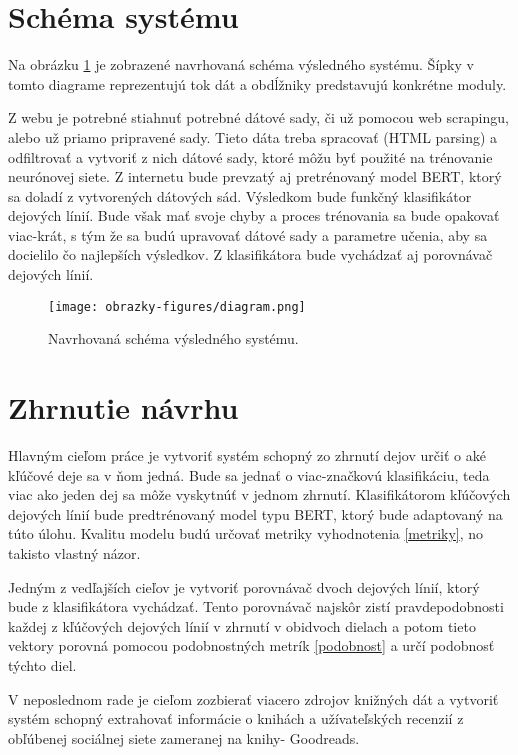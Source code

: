 \section{Schéma systému}

Na obrázku \ref{schema} je zobrazené navrhovaná schéma výsledného systému. Šípky v tomto diagrame reprezentujú tok dát a obdĺžniky predstavujú konkrétne moduly.

Z webu je potrebné stiahnuť potrebné dátové sady, či už pomocou web scrapingu, alebo už priamo pripravené sady. Tieto dáta treba spracovať (HTML parsing) a odfiltrovať a vytvoriť z nich dátové sady, ktoré môžu byť použité na trénovanie neurónovej siete. Z internetu bude prevzatý aj pretrénovaný model BERT, ktorý sa doladí z vytvorených dátových sád. Výsledkom bude funkčný klasifikátor dejových línií. Bude však mať svoje chyby a proces trénovania sa bude opakovať viac-krát, s tým že sa budú upravovať dátové sady a parametre učenia, aby sa docielilo čo najlepších výsledkov. Z klasifikátora bude vychádzať aj porovnávač dejových línií.

\begin{figure}[ht!]
	\centering
	\texttt{[image: obrazky-figures/diagram.png]}
	\caption{Navrhovaná schéma výsledného systému.}
	\label{schema}
\end{figure}

\section{Zhrnutie návrhu}

Hlavným cieľom práce je vytvoriť systém schopný zo zhrnutí dejov určiť o aké kľúčové deje sa v ňom jedná. Bude sa jednať o viac-značkovú klasifikáciu, teda viac ako jeden dej sa môže vyskytnúť v jednom zhrnutí. Klasifikátorom kľúčových dejových línií bude predtrénovaný model typu BERT, ktorý bude adaptovaný na túto úlohu. Kvalitu modelu budú určovať metriky vyhodnotenia \ref{metriky}, no takisto vlastný názor.

Jedným z vedľajších cieľov je vytvoriť porovnávač dvoch dejových línií, ktorý bude z klasifikátora vychádzať. Tento porovnávač najskôr zistí pravdepodobnosti každej z kľúčových dejových línií v zhrnutí  v obidvoch dielach a potom tieto vektory porovná pomocou podobnostných metrík \ref{podobnost} a určí podobnosť týchto diel.

V neposlednom rade je cieľom zozbierať viacero zdrojov knižných dát a vytvoriť systém schopný extrahovať informácie o knihách a užívateľských recenzií z obľúbenej sociálnej siete zameranej na knihy- Goodreads.

